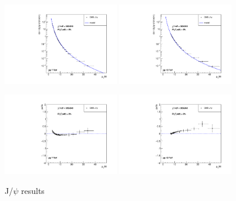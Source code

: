 \documentclass{article}
\begin{document}
\begin{figure}
\centering
\includegraphics[width = 0.45\textwidth]{jpsi_cs.pdf}
\includegraphics[width = 0.45\textwidth]{jpsi_cs_13.pdf}

\includegraphics[width = 0.45\textwidth]{jpsi_pull.pdf}
\includegraphics[width = 0.45\textwidth]{jpsi_pull_13.pdf}
\caption{J/$\psi$ results}
\end{figure}

\clearpage
\end{document}
